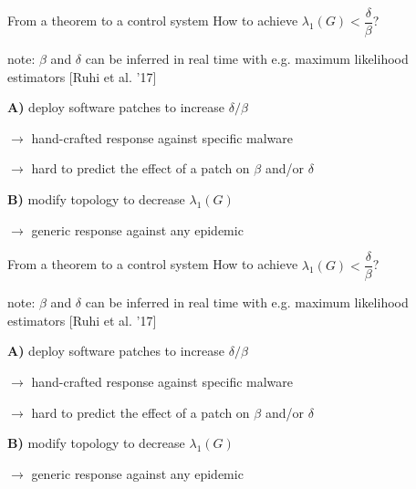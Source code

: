 \documentclass[14pt]{beamer}
\begin{document}

\begin{frame}{From a theorem to a control system}
How to achieve $\lambda_1(G) < \dfrac{\delta}{\beta}$?

\begin{fullpageitemize}
\item {\small note: $\beta$ and $\delta$ can be inferred in real time with e.g. maximum likelihood estimators [Ruhi et al. '17]}
\item
\item \textbf{A)} deploy software patches to increase $\delta / \beta$
\item $\to$ {\small hand-crafted response against specific malware}
\item $\to$ {\small hard to predict the effect of a patch on $\beta$ and/or $\delta$}
\item
\item \textbf{B)} modify topology to decrease $\lambda_1(G)$
\item $\to$ {\small generic response against any epidemic}
\end{fullpageitemize}
\end{frame}

\begin{frame}[noframenumbering]{From a theorem to a control system}
How to achieve $\lambda_1(G) < \dfrac{\delta}{\beta}$?
\begin{fullpageitemize}
\item {\small note: $\beta$ and $\delta$ can be inferred in real time with e.g. maximum likelihood estimators [Ruhi et al. '17]}
\item
\item \textbf{{\color{red} A)}} deploy software 
patches to increase $\delta / \beta$
\item $\to$ {\small hand-crafted response against specific malware}
\item $\to$ {\small hard to predict the effect of a patch on $\beta$ and/or $\delta$}
\item
\item \textbf{{\color{green} B)}} modify topology to decrease $\lambda_1(G)$
\item $\to$ {\small generic response against any epidemic}
\end{fullpageitemize}
\end{frame}
\end{document}
